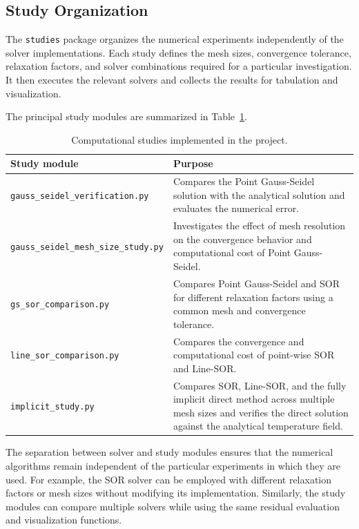 
\subsection{Study Organization}

The \texttt{studies} package organizes the numerical experiments independently of the solver implementations. Each study defines the mesh sizes, convergence tolerance, relaxation factors, and solver combinations required for a particular investigation. It then executes the relevant solvers and collects the results for tabulation and visualization.

The principal study modules are summarized in Table~\ref{tab:study_modules}.

\begin{table}[H]
\centering
\small
\caption{Computational studies implemented in the project.}
\label{tab:study_modules}
\begin{tabularx}{\textwidth}{l X}
\toprule
\textbf{Study module} & \textbf{Purpose} \\
\midrule

\texttt{gauss\_seidel\_verification.py}
& Compares the Point Gauss-Seidel solution with the analytical solution and evaluates the numerical error. \\

\texttt{gauss\_seidel\_mesh\_size\_study.py}
& Investigates the effect of mesh resolution on the convergence behavior and computational cost of Point Gauss-Seidel. \\

\texttt{gs\_sor\_comparison.py}
& Compares Point Gauss-Seidel and SOR for different relaxation factors using a common mesh and convergence tolerance. \\

\texttt{line\_sor\_comparison.py}
& Compares the convergence and computational cost of point-wise SOR and Line-SOR. \\

\texttt{implicit\_study.py}
& Compares SOR, Line-SOR, and the fully implicit direct method across multiple mesh sizes and verifies the direct solution against the analytical temperature field. \\

\bottomrule
\end{tabularx}
\end{table}

The separation between solver and study modules ensures that the numerical algorithms remain independent of the particular experiments in which they are used. For example, the SOR solver can be employed with different relaxation factors or mesh sizes without modifying its implementation. Similarly, the study modules can compare multiple solvers while using the same residual evaluation and visualization functions.

